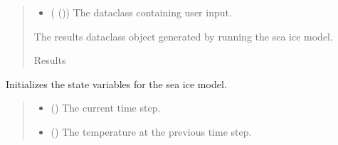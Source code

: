 \documentclass[a4paper,11pt,english,openany]{sphinxmanual}
\begin{document}
\begin{fulllineitems}
\begin{fulllineitems}
\begin{quote}
\begin{description}
\begin{itemize}
\item {} 
\sphinxAtStartPar
{} ({\hyperref[\detokenize{api/spyice.parameters.user_input:spyice.parameters.user_input.UserInput}]{}} ()) \textendash{} The dataclass containing user input.

\end{itemize}

\sphinxAtStartPar
The results dataclass object generated by running the sea ice model.

\sphinxAtStartPar
Results

\end{description}\end{quote}

\end{fulllineitems}


\begin{fulllineitems}
\label{\detokenize{api/spyice.models.sea_ice_model:spyice.models.sea_ice_model.SeaIceModel.initialize_state_variables}}
\pysigstartsignatures
{}
\pysigstopsignatures
\sphinxAtStartPar
Initializes the state variables for the sea ice model.
\begin{quote}\begin{description}
\begin{itemize}
\item {} 
\sphinxAtStartPar
{} () \textendash{} The current time step.

\item {} 
\sphinxAtStartPar
{} () \textendash{} The temperature at the previous time step.


\end{itemize}
\end{description}
\end{quote}
\end{fulllineitems}
\end{fulllineitems}
\end{document}
